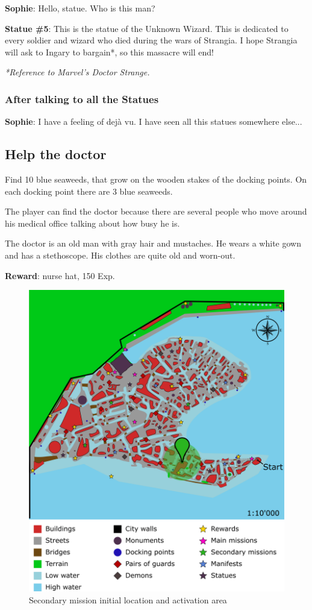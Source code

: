 \textbf{Sophie}: Hello, statue. Who is this man?

\textbf{Statue \#{}5}: This is the statue of the Unknown Wizard. This is dedicated to every soldier and wizard who died during the wars of Strangia. I hope Strangia will ask to Ingary to bargain*, so this massacre will end!

\textit{*Reference to Marvel\texttrademark 's Doctor Strange.}

\subsubsection*{After talking to all the Statues}
\textbf{Sophie}: I have a feeling of dejà vu. I have seen all this statues somewhere else...


\subsection{Help the doctor}
Find 10 blue seaweeds, that grow on the wooden stakes of the docking points. On each docking point there are 3 blue seaweeds.

The player can find the doctor because there are several people who move around his medical office talking about how busy he is.

The doctor is an old man with gray hair and mustaches. He wears a white gown and has a stethoscope. His clothes are quite old and worn-out.

\textbf{Reward}: nurse hat, 150 Exp.

\begin{figure}[H]
  \centering
  \includegraphics[width=\textwidth]{../Images/Maps/dynamiaSecondaryMissions_Doctor}
  \caption{Secondary mission initial location and activation area}
\end{figure}

